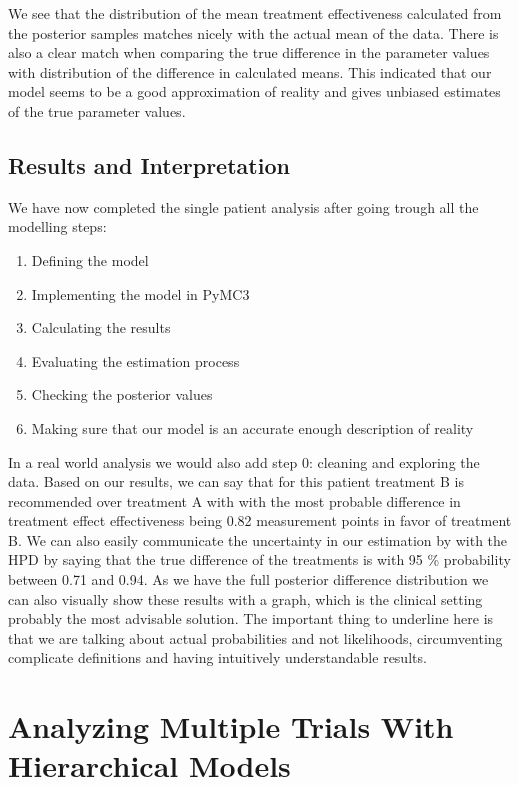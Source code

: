 \documentclass[12pt,a4paper,leqno]{report}
\theoremstyle{plain}
\theoremstyle{definition}
\theoremstyle{remark}
\begin{document}

We see that the distribution of the mean treatment effectiveness calculated from the
posterior samples matches nicely with the actual mean of the data. There is also a clear
match when comparing the true difference in the parameter values with distribution of
the difference in calculated means. This indicated that our
model seems to be a good approximation of reality and gives unbiased estimates of the
true parameter values.

\subsection{Results and Interpretation}

We have now completed the single patient analysis after going trough all the modelling steps:

\begin{enumerate}
    \item Defining the model
    \item Implementing the model in PyMC3
    \item Calculating the results
    \item Evaluating the estimation process
    \item Checking the posterior values
    \item Making sure that our model is an accurate enough description of reality
\end{enumerate}

In a real world analysis we would also add step 0: cleaning and exploring the data.
Based on our results, we can say that for this patient treatment B is recommended over treatment A with
with the most probable difference in treatment effect effectiveness being 0.82
measurement points in favor of treatment B. We can also easily communicate
the uncertainty in our estimation by with the HPD by saying that the true difference of
the treatments is with 95 \% probability between 0.71 and 0.94. As we have the full
posterior difference distribution we can also visually show these results with a graph,
which is the clinical setting probably the most advisable solution. The important thing
to underline here is that we are talking about actual probabilities and not likelihoods,
circumventing complicate definitions and having intuitively understandable results.

\section{Analyzing Multiple Trials With Hierarchical Models}\label{pooling}
\end{document}
